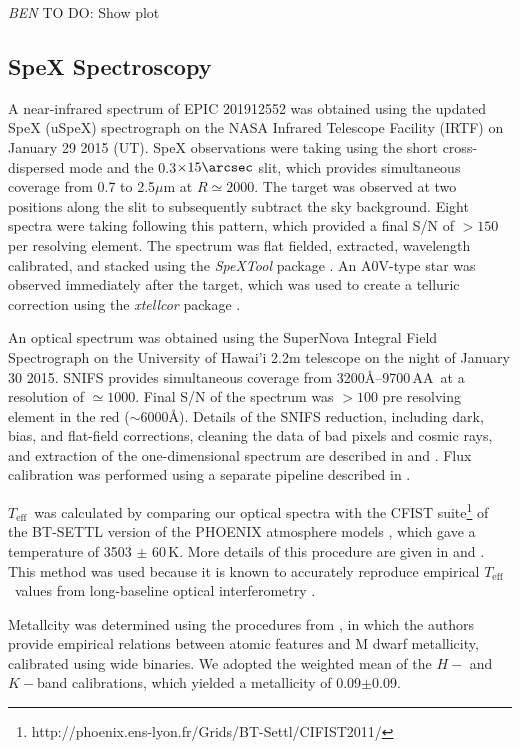 \documentclass{emulateapj}
\newcommand\teff{\ensuremath{T_\text{eff}}}
\newcommand{\todo}[3]{{\color{#2} \emph{#1} TO DO: #3}}
\newcommand{\btmtodo}[1]{\todo{BEN}{red}{#1}}
\begin{document}
\btmtodo{Show plot}



\subsection{SpeX Spectroscopy}
\label{Spexobs}


A near-infrared spectrum of EPIC 201912552 was obtained using the updated SpeX 
(uSpeX) spectrograph \citep{Rayner03} on the NASA Infrared Telescope Facility 
(IRTF) on January 29 2015 (UT). 
SpeX observations were taking using the short cross-dispersed mode and the
0.3$\times15\arcsec$ slit, which provides simultaneous coverage from 0.7 
to 2.5$\mu$m at $R\simeq2000$. 
The target was observed at two positions along the slit to subsequently subtract 
the sky background. Eight spectra were taking following this pattern, which provided 
a final S/N of $>150$ per resolving element. 
The spectrum was flat fielded, extracted, wavelength calibrated, and stacked 
using the \textit{SpeXTool} package \citep{Cushing04}. 
An A0V-type star was observed immediately after 
the target, which was used to create a telluric correction using the 
\textit{xtellcor} package \citep{Vacca03}.

An optical spectrum was obtained using the SuperNova Integral Field Spectrograph
\citep[SNIFS,][]{Aldering02,Lantz04} on the University of Hawai'i 
2.2m telescope on the night of January 30 2015. 
SNIFS provides simultaneous coverage from 3200\AA--9700\,AA\ at a resolution 
of $\simeq1000$. Final S/N of the spectrum was $>100$ pre resolving element 
in the red ($\sim6000$\AA). 
Details of the SNIFS reduction, including dark, bias, and flat-field corrections,
cleaning the data of bad pixels and cosmic rays, and extraction of the 
one-dimensional spectrum are described in \citet{Bacon01} and 
\citet{Aldering06}. 
Flux calibration was performed using a separate pipeline described in \citet{Mann15}. 

\teff\ was calculated by comparing our optical spectra with the CFIST
suite\footnote{http://phoenix.ens-lyon.fr/Grids/BT-Settl/CIFIST2011/} of the BT-SETTL
version of the PHOENIX atmosphere models \citep{Allard13}, which gave a temperature
of 3503 $\pm$ 60\,K. 
More details of this procedure are given in \citet{Mann14} and
\citet{Gaidos14}. 
This method was used because it is known to accurately reproduce empirical 
\teff\ values from long-baseline optical interferometry \citet{Boyajian12}. 

Metallcity was determined using the procedures from \citet{Mann13a}, in which the
authors provide empirical relations between atomic features and M dwarf
metallicity, calibrated using wide binaries. 
We adopted the weighted mean of the $H-$ and $K-$band calibrations, 
which yielded a metallicity of 0.09$\pm$0.09.
\end{document}
